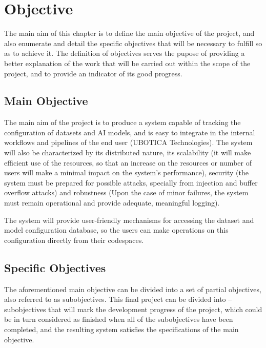 \chapter{Objective}
\label{cap:Objective}

The main aim of this chapter is to define the main objective of the project, and also enumerate and detail the specific objectives that will be necessary to fulfill so as to
achieve it. The definition of objectives serves the pupose of providing a better explanation of the work that will be carried out
within the scope of the project, and to provide an indicator of its good progress.

\section{Main Objective}

The main aim of the project is to produce a system capable of tracking the configuration of datasets and \acrshort{AI} models, and is easy to integrate in the internal workflows
and pipelines of the end user (UBOTICA Technologies). The system will also be characterized by its distributed nature, its scalability (it will
make efficient use of the resources, so that an increase on the resources or number of users will make a minimal impact on the system's performance), security (the system must
be prepared for possible attacks, specially from injection and buffer overflow attacks) and robustness (Upon the case of minor failures, the system must remain operational and provide
adequate, meaningful logging).

The system will provide user-friendly mechanisms for accessing the dataset and model configuration database, so the users can make operations on this configuration directly from
their codespaces.

\section{Specific Objectives}

The aforementioned main objective can be divided into a set of partial objectives, also referred to as subobjectives. This final project can be divided into -- subobjectives
that will mark the development progress of the project, which could be in turn considered as finished when all of the subobjectives have been completed, and the resulting system
satisfies the specifications of the main objective.

